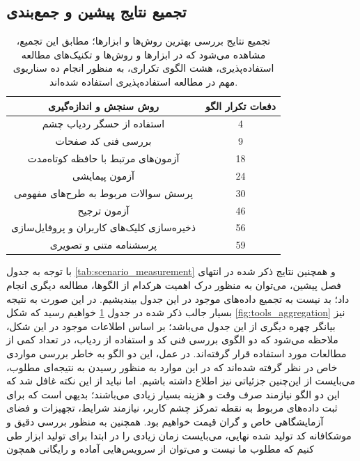 \subsection{تجمیع نتایج پیشین و جمع‌بندی}
\begin{table}[H]
	\caption[
	تجمیع نتایج بررسی بهترین روش‌ها و ابزارها
	]{
		تجمیع نتایج بررسی بهترین روش‌ها و ابزارها؛ مطابق این تجمیع، مشاهده می‌شود که در ابزارها و روش‌ها و تکنیک‌های مطالعه استفاده‌پذیری، هشت الگوی تکراری، به منظور انجام ده سناریوی مهم در مطالعه استفاده‌پذیری استفاده شده‌اند.
	}
	\label{tab:tools_aggregated}
	\centering
	\begin{tabular}{|c|c|}
		\hline
		روش سنجش و اندازه‌گیری & دفعات تکرار الگو \\ \hline
		استفاده از حسگر ردیاب چشم & 4 \\ \hline
		بررسی فنی کد صفحات & 9 \\ \hline
		آزمون‌های مرتبط با حافظه کوتاه‌مدت & 18 \\ \hline
		آزمون پیمایشی & 24 \\ \hline
		پرسش سوالات مربوط به طرح‌های مفهومی & 30 \\ \hline
		آزمون ترجیح & 46 \\ \hline
		ذخیره‌سازی کلیک‌های کاربران و پروفایل‌سازی & 56 \\ \hline
		پرسشنامه متنی و تصویری & 59 \\ \hline
	\end{tabular}
\end{table}
با توجه به جدول
\ref{tab:scenario_measurement}
و همچنین نتایج ذکر شده در انتهای فصل پیشین، می‌توان به منظور درک اهمیت هرکدام از الگوها، مطالعه دیگری انجام داد؛ بد نیست به تجمیع داده‌های موجود در این جدول بیندیشیم. در این صورت به نتیجه بسیار جالب ذکر شده در جدول
\ref{tab:tools_aggregated}
خواهیم رسید که شکل
\ref{fig:tools_aggregation}
نیز بیانگر چهره دیگری از این جدول می‌باشد؛ بر اساس اطلاعات موجود در این شکل، ملاحظه می‌شود که دو الگوی بررسی فنی کد و استفاده از ردیاب، در تعداد کمی از مطالعات مورد استفاده قرار گرفته‌اند. در عمل، این دو الگو به خاطر بررسی مواردی خاص در نظر گرفته شده‌اند که در این موارد به منظور رسیدن به نتیجه‌ای مطلوب، می‌بایست از این‌چنین جزئیاتی نیز اطلاع داشته باشیم. اما نباید از این نکته غافل شد که این دو الگو نیازمند صرف وقت و هزینه بسیار زیادی می‌باشند؛ بدیهی است که برای ثبت داده‌های مربوط به نقطه تمرکز چشم کاربر، نیازمند شرایط، تجهیزات و فضای آزمایشگاهی خاص و گران قیمت خواهیم بود. همچنین به منظور بررسی دقیق و موشکافانه کد تولید شده نهایی، می‌بایست زمان زیادی را در ابتدا برای تولید ابزار طی کنیم که مطلوب ما نیست و می‌توان از سرویس‌هایی آماده و رایگانی همچون
